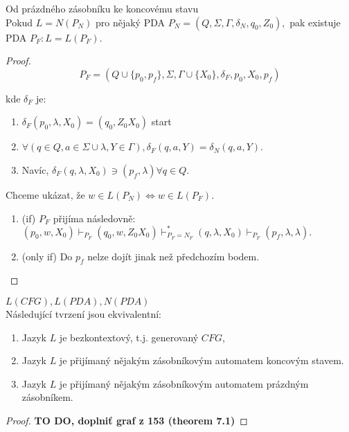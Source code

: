 \documentclass[../main.tex]{subfiles}
\begin{document}
    \begin{theorem}
        Od prázdného zásobníku ke koncovému stavu\\

        Pokud $L = N(P_N)$ pro nějaký PDA $P_N = (Q,\Sigma, \Gamma, \delta_N, q_0, Z_0),$ pak existuje PDA $P_F : L = L(P_F)$.
        
        \begin{proof}
            \[P_F = (Q\cup \{p_0,p_f\},\Sigma, \Gamma \cup \{X_0\}, \delta_F, p_0, X_0, {p_f})\]

            kde $\delta_F$ je:
            \begin{enumerate}
                \item $\delta_F(p_0, \lambda, X_0) = {(q_0,Z_0 X_0)}$ start
                \item $\forall (q\in Q, a \in \Sigma \cup {\lambda}, Y \in \Gamma), \delta_F(q,a,Y) = \delta_N(q,a,Y)$.
                \item Navíc, $\delta_F(q,\lambda, X_0) \ni (p_f, \lambda) \forall q\in Q$. 
            \end{enumerate}
            Chceme ukázat, že $w \in L(P_N) \Leftrightarrow w \in L(P_F)$.
            \begin{enumerate}
                \item (if) $P_F$ přijíma následovně:
                $(p_0, w, X_0) \vdash_{P_F}(q_0,w,Z_0 X_0)\vdash^*_{P_F=N_F}
                (q,\lambda, X_0) \vdash_{P_F}(p_f,\lambda,\lambda).$
                \item (only if) Do $p_f$ nelze dojít jinak než předchozím bodem.
            \end{enumerate}
        \end{proof}
    \end{theorem}

    \begin{theorem}
        $L(CFG), L(PDA), N(PDA)$\\

        Následující tvrzení jsou ekvivalentní:
        \begin{enumerate}
            \item Jazyk $L$ je bezkontextový, t.j. generovaný $CFG$,
            \item Jazyk $L$ je přijímaný nějakým zásobníkovým automatem koncovým stavem.
            \item Jazyk $L$ je přijímaný nějakým zásobníkovým automatem prázdným zásobníkem.
        \end{enumerate}

        \begin{proof}
            \textbf{TO DO, doplniť graf z 153 (theorem 7.1)}    
        \end{proof}
    \end{theorem}
\end{document}
